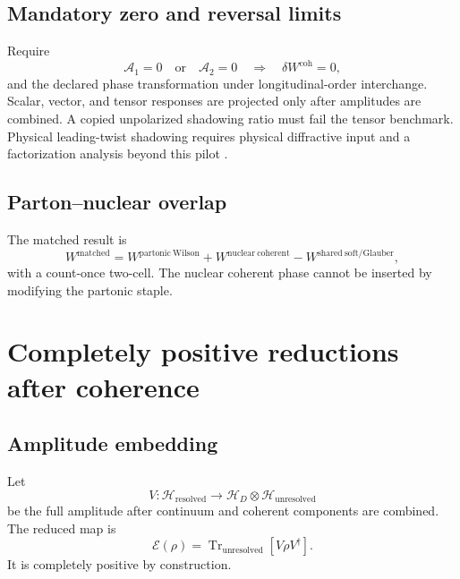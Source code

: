 \documentclass[11pt]{article}
\newcommand{\Tr}{\operatorname{Tr}}
\newcommand{\Hil}{\mathcal H}
\newcommand{\cE}{\mathcal E}
\begin{document}
\subsection{Mandatory zero and reversal limits}

Require
\begin{equation}
 \mathcal A_1=0\quad\text{or}\quad\mathcal A_2=0
 \quad\Longrightarrow\quad
 \delta W^{\mathrm{coh}}=0,
 \label{eq:coherent-zero}
\end{equation}
and the declared phase transformation under longitudinal-order interchange.
Scalar, vector, and tensor responses are projected only after amplitudes are
combined.  A copied unpolarized shadowing ratio must fail the tensor
benchmark.  Physical leading-twist shadowing requires physical diffractive
input and a factorization analysis beyond this pilot \cite{FrankfurtGuzeyStrikman2012}.

\subsection{Parton--nuclear overlap}

The matched result is
\begin{equation}
 W^{\mathrm{matched}}
 =W^{\mathrm{partonic\ Wilson}}
 +W^{\mathrm{nuclear\ coherent}}
 -W^{\mathrm{shared\ soft/Glauber}},
 \label{eq:parton-nuclear-overlap}
\end{equation}
with a count-once two-cell.  The nuclear coherent phase cannot be inserted by
modifying the partonic staple.

\section{Completely positive reductions after coherence}
\label{sec:cp}

\subsection{Amplitude embedding}

Let
\begin{equation}
 V:\Hil_{\mathrm{resolved}}
 \longrightarrow
 \Hil_D\otimes\Hil_{\mathrm{unresolved}}
 \label{eq:amplitude-embedding}
\end{equation}
be the full amplitude after continuum and coherent components are combined.
The reduced map is
\begin{equation}
 \cE(\rho)
 =\Tr_{\mathrm{unresolved}}
 \left[V\rho V^{\dagger}\right].
 \label{eq:cp-map}
\end{equation}
It is completely positive by construction.
\end{document}
